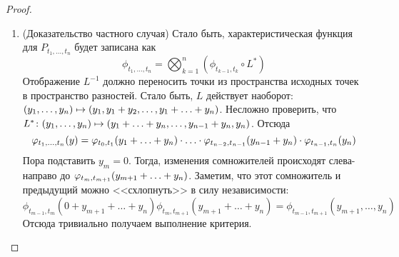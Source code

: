 \begin{proof}
\begin{itemize}
\begin{enumerate}
			\begin{proof}
				Распишем характеристическую функцию $\mu$ по определению:
				\begin{multline*}
					\phi_{\mu'}(y) = \int_{\R^n} e^{i(y, x)}d(\mu \circ L^{-1})(x) = \int_{\R^n} e^{i(y, x)}d\mu(L^{-1}x) =
					\\
					\int_{\R^n} e^{i(y, Lu)}d\mu(u) = \int_{\R^n} e^{i(L^*y, u)}d\mu(u) = \phi_\mu(L^*y)
				\end{multline*}
			\end{proof}
			
			\begin{lemma}
				Пусть $\mu = \mu_1 \otimes \ldots \otimes \mu_n$ --- мера на $(\R^n, \B(\R^n))$, а $\mu_k$ --- меры на $(\R, \B(\R))$. Тогда
				\[
					\phi_\mu = \bigotimes_{k = 1}^n \phi_{\mu_k}
				\]
			\end{lemma}
			
			\begin{proof}
				Снова воспользуемся определением характеристической функции:
				\begin{multline*}
					\phi_\mu(y_1, \ldots, y_n) = \int_{\R^n} e^{i(y, x)}d\mu(x) = \int_{\R^n} \prod_{k = 1}^n e^{iy_kx_k}d\mu(x_1, \ldots, x_n) = [\text{т. Фубини}] =
					\\
					\int_\R \cdots \int_\R \prod_{k = 1}^n e^{iy_kx_k} d\mu(x_1) \ldots d\mu(x_n) = \prod_{k = 1}^n \phi_{\mu_k}(y_k)
				\end{multline*}
			\end{proof}
			
			\item (Доказательство частного случая) Стало быть, характеристическая функция для $P_{t_1, \ldots, t_n}$ будет записана как
			\[
				\phi_{t_1, \ldots, t_n} = \bigotimes_{k = 1}^n (\phi_{t_{k - 1}, t_k} \circ L^*)
			\]
			Отображение $L^{-1}$ должно переносить точки из пространства исходных точек в пространство разностей. Стало быть, $L$ действует наоборот: $(y_1, \ldots, y_n) \mapsto (y_1, y_1 + y_2, \ldots, y_1 + \ldots + y_n)$. Несложно проверить, что $L^* \colon (y_1, \ldots, y_n) \mapsto (y_1 + \ldots + y_n, \ldots, y_{n - 1} + y_n, y_n)$. Отсюда
			\[
				\varphi_{t_1, \ldots, t_n}(y) = \varphi_{t_0, t_1}(y_1 + \ldots + y_n) \cdot \ldots \cdot \varphi_{t_{n - 2}, t_{n - 1}}(y_{n - 1} + y_n) \cdot \varphi_{t_{n - 1}, t_n}(y_n)
			\]
			Пора подставить $y_m = 0$. Тогда, изменения сомножителей происходят слева-направо до $\varphi_{t_m, t_{m + 1}}(y_{m + 1} + \ldots + y_n)$. Заметим, что этот сомножитель и предыдущий можно <<схлопнуть>> в силу независимости:
			\[
				\phi_{t_{m - 1}, t_m}(0 + y_{m + 1} + \ldots + y_n)\phi_{t_m, t_{m + 1}}(y_{m + 1} + \ldots + y_n) = \phi_{t_{m - 1}, t_{m + 1}}(y_{m + 1}, \ldots, y_n)
			\]
			Отсюда тривиально получаем выполнение критерия.
			

\end{enumerate}
\end{itemize}
\end{proof}
